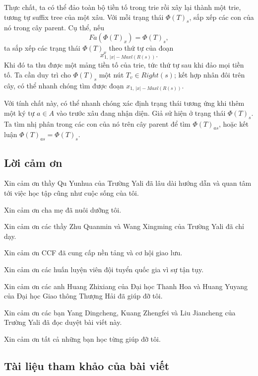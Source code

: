 \documentclass[11pt]{article}
\begin{document}
Thực chất, ta có thể đảo toàn bộ tiền tố trong trie rồi xây lại thành một trie,
tương tự suffix tree của một xâu. Với mỗi trạng thái \(\Phi(T)_s\), sắp xếp
các con của nó trong cây parent. Cụ thể, nếu
\[
  Fa(\Phi(T)_x)=\Phi(T)_s,
\]
ta sắp xếp các trạng thái \(\Phi(T)_x\) theo thứ tự của đoạn
\[
  x_{1,\,|x|-Maxl(R(s))}.
\]
Khi đó ta thu được một mảng tiền tố của trie, tức thứ tự sau khi đảo mọi tiền tố.
Ta cần duy trì cho \(\Phi(T)_s\) một nút \(T_v\in Right(s)\); kết hợp nhân đôi
trên cây, có thể nhanh chóng tìm được đoạn \(x_{1,\,|x|-Maxl(R(s))}\).

Với tính chất này, có thể nhanh chóng xác định trạng thái tương ứng khi thêm một
ký tự \(a\in A\) vào trước xâu đang nhận diện. Giả sử hiện ở trạng thái
\(\Phi(T)_s\). Ta tìm nhị phân trong các con của nó trên cây parent để tìm
\(\Phi(T)_{as}\), hoặc kết luận \(\Phi(T)_{as}=\Phi(T)_s\).

\subsection{Lời cảm ơn}

Xin cảm ơn thầy Qu Yunhua của Trường Yali đã lâu dài hướng dẫn và quan tâm tới
việc học tập cũng như cuộc sống của tôi.

Xin cảm ơn cha mẹ đã nuôi dưỡng tôi.

Xin cảm ơn các thầy Zhu Quanmin và Wang Xingming của Trường Yali đã chỉ dạy.

Xin cảm ơn CCF đã cung cấp nền tảng và cơ hội giao lưu.

Xin cảm ơn các huấn luyện viên đội tuyển quốc gia vì sự tận tụy.

Xin cảm ơn các anh Huang Zhixiang của Đại học Thanh Hoa và Huang Yuyang của Đại
học Giao thông Thượng Hải đã giúp đỡ tôi.

Xin cảm ơn các bạn Yang Dingcheng, Kuang Zhengfei và Liu Jiancheng của Trường
Yali đã đọc duyệt bài viết này.

Xin cảm ơn tất cả những bạn học từng giúp đỡ tôi.

\subsection*{Tài liệu tham khảo của bài viết}
\end{document}

